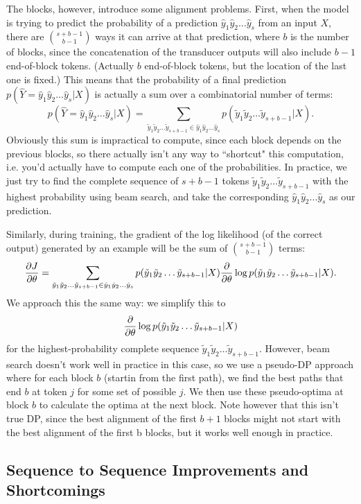 The blocks, however, introduce some alignment problems. First, when the model is trying to predict the probability of a prediction $\hat{y}_1\hat{y}_2\dots\hat{y}_s$ from an input $X$, there are $\binom{s + b - 1}{b - 1}$ ways it can arrive at that prediction, where $b$ is the number of blocks, since the concatenation of the transducer outputs will also include $b-1$ end-of-block tokens. (Actually $b$ end-of-block tokens, but the location of the last one is fixed.) This means that the probability of a final prediction $p(\hat{Y} = \hat{y}_1\hat{y}_2\dots\hat{y}_s | X)$ is actually a sum over a combinatorial number of terms:
$$p(\hat{Y} = \hat{y}_1\hat{y}_2\dots\hat{y}_s | X) = \sum_{\tilde{y}_1\tilde{y}_2\dots\tilde{y}_{s + b - 1} \in \hat{y}_1\hat{y}_2\dots\hat{y}_s} p(\tilde{y}_1\tilde{y}_2\dots\tilde{y}_{s + b - 1} | X).$$
Obviously this sum is impractical to compute, since each block depends on the previous blocks, so there actually isn't any way to ``shortcut" this computation, i.e. you'd actually have to compute each one of the probabilities. In practice, we just try to find the complete sequence of $s + b - 1$ tokens $\tilde{y}_1\tilde{y}_2\dots\tilde{y}_{s+b-1}$ with the highest probability using beam search, and take the corresponding $\hat{y}_1\hat{y}_2\dots\hat{y}_s$ as our prediction.

Similarly, during training, the gradient of the log likelihood (of the correct output) generated by an example will be the sum of $\binom{s+b-1}{b-1}$ terms:
$$\frac{\partial J}{\partial \theta} = \sum_{\tilde{y}_1\tilde{y}_2\dots\tilde{y}_{s + b - 1} \in \hat{y}_1\hat{y}_2\dots\hat{y}_s} p(\tilde{y}_1\tilde{y}_2\dots\tilde{y}_{s + b - 1} | X) \frac{\partial }{\partial \theta} \log p(\tilde{y}_1\tilde{y}_2\dots\tilde{y}_{s + b - 1} | X).$$
We approach this the same way: we simplify this to
$$\frac{\partial }{\partial \theta}\log p(\tilde{y}_1\tilde{y}_2\dots\tilde{y}_{s + b - 1} | X)$$
for the highest-probability complete sequence $\tilde{y}_1\tilde{y}_2\dots\tilde{y}_{s+b-1}$. However, beam search doesn't work well in practice in this case, so we use a pseudo-DP approach where for each block $b$ (startin from the first path), we find the best paths that end $b$ at token $j$ for some set of possible $j$. We then use these pseudo-optima at block $b$ to calculate the optima at the next block. Note however that this isn't true DP, since the best alignment of the first $b+1$ blocks might not start with the best alignment of the first b blocks, but it works well enough in practice.

\subsection{Sequence to Sequence Improvements and Shortcomings}

